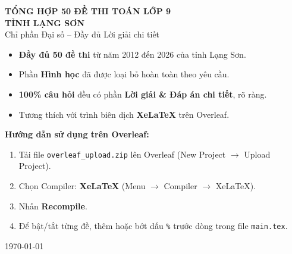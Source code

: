 \documentclass[12pt,a4paper]{article}
\begin{document}
\begin{titlepage}
  \centering\vspace*{2.0cm}
  \begin{tcolorbox}[
    colback=titlebg, colframe=titlebg!80!black,
    arc=10pt, boxrule=2pt,
    width=\textwidth,
    halign=center,
    top=24pt, bottom=24pt
  ]
    {\color{white}\fontsize{24}{30}\selectfont\bfseries
      TỔNG HỢP 50 ĐỀ THI TOÁN LỚP 9}\\[10pt]
    {\color{white}\Large\bfseries TỈNH LẠNG SƠN}\\[16pt]
    {\color{white}\large Chỉ phần Đại số -- Đầy đủ Lời giải chi tiết}
  \end{tcolorbox}

  \vspace{1.2cm}
  \begin{tcolorbox}[colback=warnbg,colframe=warnborder,arc=5pt,
    boxrule=0.6pt,width=0.9\textwidth,halign=left]
    \begin{itemize}[leftmargin=1.5em]
      \item \textbf{Đầy đủ 50 đề thi} từ năm 2012 đến 2026 của tỉnh Lạng Sơn.
      \item Phần \textbf{Hình học} đã được loại bỏ hoàn toàn theo yêu cầu.
      \item \textbf{100\% câu hỏi} đều có phần \textbf{Lời giải \& Đáp án chi tiết}, rõ ràng.
      \item Tương thích với trình biên dịch \textbf{XeLaTeX} trên Overleaf.
    \end{itemize}
  \end{tcolorbox}

  \vspace{1.2cm}
  \textbf{Hướng dẫn sử dụng trên Overleaf:}
  \begin{enumerate}[leftmargin=2em]
    \item Tải file \texttt{overleaf\_upload.zip} lên Overleaf
          (New Project $\to$ Upload Project).
    \item Chọn Compiler: \textbf{XeLaTeX}
          (Menu $\to$ Compiler $\to$ XeLaTeX).
    \item Nhấn \textbf{Recompile}.
    \item Để bật/tắt từng đề, thêm hoặc bớt dấu \texttt{\%} trước dòng
          \verb|| trong file \texttt{main.tex}.
  \end{enumerate}

  \vfill
  {\small\color{gray}\today}
\end{titlepage}
\end{document}
